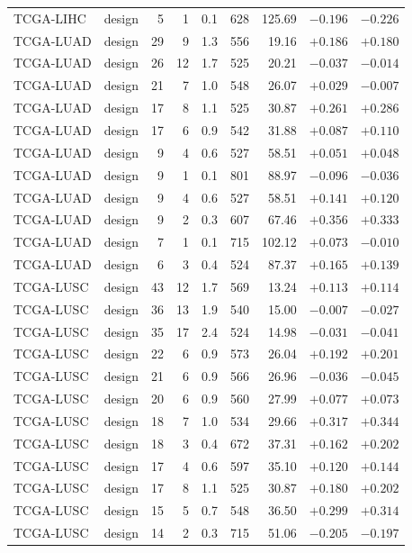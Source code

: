 \begin{longtable}{@{}llrrrrrrr@{}}
TCGA-LIHC & design & 5 & 1 & 0.1 & 628 & 125.69 & $-0.196$ & $-0.226$\\
TCGA-LUAD & design & 29 & 9 & 1.3 & 556 & 19.16 & $+0.186$ & $+0.180$\\
TCGA-LUAD & design & 26 & 12 & 1.7 & 525 & 20.21 & $-0.037$ & $-0.014$\\
TCGA-LUAD & design & 21 & 7 & 1.0 & 548 & 26.07 & $+0.029$ & $-0.007$\\
TCGA-LUAD & design & 17 & 8 & 1.1 & 525 & 30.87 & $+0.261$ & $+0.286$\\
TCGA-LUAD & design & 17 & 6 & 0.9 & 542 & 31.88 & $+0.087$ & $+0.110$\\
TCGA-LUAD & design & 9 & 4 & 0.6 & 527 & 58.51 & $+0.051$ & $+0.048$\\
TCGA-LUAD & design & 9 & 1 & 0.1 & 801 & 88.97 & $-0.096$ & $-0.036$\\
TCGA-LUAD & design & 9 & 4 & 0.6 & 527 & 58.51 & $+0.141$ & $+0.120$\\
TCGA-LUAD & design & 9 & 2 & 0.3 & 607 & 67.46 & $+0.356$ & $+0.333$\\
TCGA-LUAD & design & 7 & 1 & 0.1 & 715 & 102.12 & $+0.073$ & $-0.010$\\
TCGA-LUAD & design & 6 & 3 & 0.4 & 524 & 87.37 & $+0.165$ & $+0.139$\\
TCGA-LUSC & design & 43 & 12 & 1.7 & 569 & 13.24 & $+0.113$ & $+0.114$\\
TCGA-LUSC & design & 36 & 13 & 1.9 & 540 & 15.00 & $-0.007$ & $-0.027$\\
TCGA-LUSC & design & 35 & 17 & 2.4 & 524 & 14.98 & $-0.031$ & $-0.041$\\
TCGA-LUSC & design & 22 & 6 & 0.9 & 573 & 26.04 & $+0.192$ & $+0.201$\\
TCGA-LUSC & design & 21 & 6 & 0.9 & 566 & 26.96 & $-0.036$ & $-0.045$\\
TCGA-LUSC & design & 20 & 6 & 0.9 & 560 & 27.99 & $+0.077$ & $+0.073$\\
TCGA-LUSC & design & 18 & 7 & 1.0 & 534 & 29.66 & $+0.317$ & $+0.344$\\
TCGA-LUSC & design & 18 & 3 & 0.4 & 672 & 37.31 & $+0.162$ & $+0.202$\\
TCGA-LUSC & design & 17 & 4 & 0.6 & 597 & 35.10 & $+0.120$ & $+0.144$\\
TCGA-LUSC & design & 17 & 8 & 1.1 & 525 & 30.87 & $+0.180$ & $+0.202$\\
TCGA-LUSC & design & 15 & 5 & 0.7 & 548 & 36.50 & $+0.299$ & $+0.314$\\
TCGA-LUSC & design & 14 & 2 & 0.3 & 715 & 51.06 & $-0.205$ & $-0.197$\\

\end{longtable}

